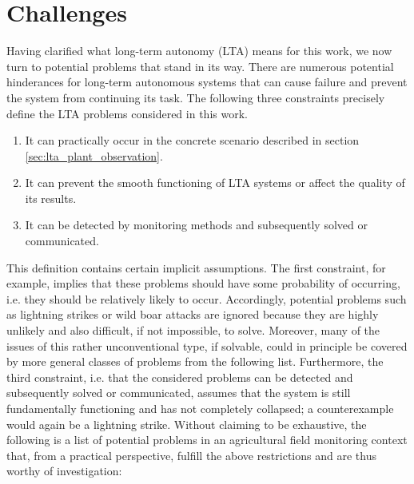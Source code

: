 \documentclass[english, master, utf8]{base/thesis_KBS}
\begin{document}
\pagebreak

\section{Challenges}
\label{sec:challenges_for_lta}

Having clarified what long-term autonomy (LTA) means for this work, we now turn to potential problems that stand in its way.
There are numerous potential hinderances for long-term autonomous systems that can cause failure and prevent the system from continuing its task.
The following three constraints precisely define the LTA problems considered in this work.
\begin{enumerate}
    \item It can practically occur in the concrete scenario described in section \ref{sec:lta_plant_observation}.
    \item It can prevent the smooth functioning of LTA systems or affect the quality of its results.
    \item It can be detected by monitoring methods and subsequently solved or communicated.
\end{enumerate}
This definition contains certain implicit assumptions. The first constraint, for example, implies that these problems should have some probability of occurring,
i.e. they should be relatively likely to occur. Accordingly, potential problems such as lightning strikes or wild boar attacks are ignored because they are highly 
unlikely and also difficult, if not impossible, to solve. Moreover, many of the issues of this rather unconventional type, if solvable, could in principle be covered
by more general classes of problems from the following list. Furthermore, the third constraint, i.e. that the considered problems can be detected and subsequently solved 
or communicated, assumes that the system is still fundamentally functioning and has not completely collapsed; a counterexample would again be a lightning strike.
Without claiming to be exhaustive, the following is a list of potential problems in an agricultural field monitoring context that, 
from a practical perspective, fulfill the above restrictions and are thus worthy of investigation:
\end{document}
